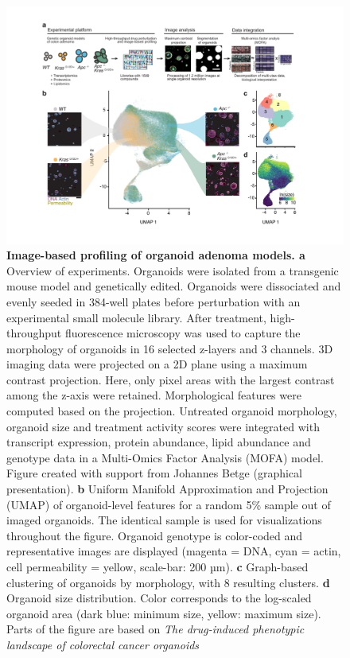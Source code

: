 \begin{flushleft}
\begin{figure}[h!]
\centering
\includegraphics[width=\textwidth,
                height=\textheight,
                keepaspectratio]{figures/adenomaprofiling/pdf/fig_1_2.pdf}
\caption[Image-based profiling of organoid adenoma models]{\textbf{Image-based profiling of organoid adenoma models. a} Overview of experiments. Organoids were isolated from a transgenic mouse model and genetically edited. Organoids were dissociated and evenly seeded in 384-well plates before perturbation with an experimental small molecule library. After treatment, high-throughput fluorescence microscopy was used to capture the morphology of organoids in 16 selected z-layers and 3 channels. 3D imaging data were projected on a 2D plane using a maximum contrast projection. Here, only pixel areas with the largest contrast among the z-axis were retained. Morphological features were computed based on the projection. Untreated organoid morphology, organoid size and treatment activity scores were integrated with transcript expression, protein abundance, lipid abundance and genotype data in a Multi-Omics Factor Analysis (MOFA) model. Figure created with support from Johannes Betge (graphical presentation). 
\textbf{b} Uniform Manifold Approximation and Projection (UMAP) of organoid-level features for a random 5\% sample out of imaged organoids. The identical sample is used for visualizations throughout the figure. Organoid genotype is color-coded and representative images are displayed (magenta = DNA, cyan = actin, cell permeability = yellow, scale-bar: 200 µm). \textbf{c} Graph-based clustering of organoids by morphology, with 8 resulting clusters. \textbf{d} Organoid size distribution. Color corresponds to the log-scaled organoid area (dark blue: minimum size, yellow: maximum size). Parts of the figure are based on \textit{The drug-induced phenotypic landscape of colorectal cancer organoids} \parencite{betgeDruginducedPhenotypicLandscape2022}}
\label{fig_120}
\end{figure}
\bigbreak


\end{flushleft}
